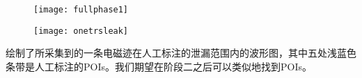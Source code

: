 {	\begin{figure}[!h]
		\begin{center}
			\texttt{[image: fullphase1]}
			\label{fig:fullphase1}
		\end{center}
	\end{figure}
	
	\begin{figure}[!h]
		\begin{center}
			\texttt{[image: onetrsleak]}
			\label{fig:onetrsleak}
		\end{center}
	\end{figure}
	
	绘制了所采集到的一条电磁迹在人工标注的泄漏范围内的波形图，其中五处浅蓝色条带是人工标注的POIs。我们期望在阶段二之后可以类似地找到POIs。
	
}
